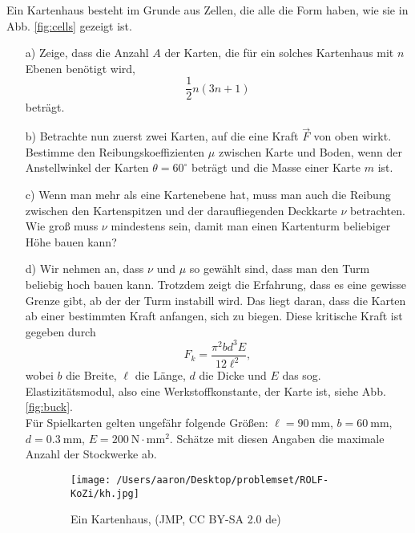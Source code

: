 \begin{Exercise}[label = cards, title = Kartenhäuser, difficulty = 4]
		Ein Kartenhaus besteht im Grunde aus Zellen, die alle die Form haben, wie sie in Abb. \ref{fig:cells} gezeigt ist.
	\begin{itemize}
		\item[a)] Zeige, dass die Anzahl $A$ der Karten, die für ein solches Kartenhaus mit $n$ Ebenen benötigt wird,
		\begin{equation}\label{number}
		\frac{1}{2}n\left(3n+1\right)
		\end{equation}
		beträgt.
		
		\item[b)] 
		Betrachte nun zuerst zwei Karten, auf die eine Kraft $\vec{F}$ von oben wirkt. Bestimme den Reibungskoeffizienten $\mu$ zwischen Karte und Boden, wenn der Anstellwinkel der Karten $\theta = 60^\circ$ beträgt und die Masse einer Karte $m$ ist.
		
		\item[c)] Wenn man mehr als eine Kartenebene hat, muss man auch die Reibung zwischen den Kartenspitzen und der daraufliegenden Deckkarte $\nu$ betrachten. Wie groß muss $\nu$ mindestens sein, damit man einen Kartenturm beliebiger Höhe bauen kann?
		\item[d)] Wir nehmen an, dass $\nu$ und $\mu$ so gewählt sind, dass man den Turm beliebig hoch bauen kann. Trotzdem zeigt die Erfahrung, dass es eine gewisse Grenze gibt, ab der der Turm instabill wird. Das liegt daran, dass die Karten ab einer bestimmten Kraft anfangen, sich zu biegen. Diese kritische Kraft ist gegeben durch
		\begin{equation}
		F_k = \frac{\pi^2 b d^3E }{12\ell^2},
		\end{equation}
		wobei $b$ die Breite, $\ell$ die Länge, $d$ die Dicke und $E$ das sog. Elastizitätsmodul, also eine Werkstoffkonstante, der Karte ist, siehe Abb. \ref{fig:buck}.\\
		Für Spielkarten gelten ungefähr folgende Größen: $\ell = 90~\mathrm{mm}$, $b=60~\mathrm{mm}$, $d = 0.3~\mathrm{mm}$, $E = 200~\mathrm{N\cdot mm^2}$. 
		Schätze mit diesen Angaben die maximale Anzahl der Stockwerke ab.
		
	\end{itemize}
	\begin{figure}[H]
		\centering
		
		\begin{subfigure}[b]{0.3\textwidth}
			\centering
			\texttt{[image: /Users/aaron/Desktop/problemset/ROLF-KoZi/kh.jpg]}
			\caption{Ein Kartenhaus, \footnotesize (JMP, CC BY-SA 2.0 de)}
			\label{fig:kh}
		\end{subfigure}
		\hfill
		\begin{subfigure}[b]{0.2\textwidth}
			\centering
\end{subfigure}
\end{figure}
\end{Exercise}
